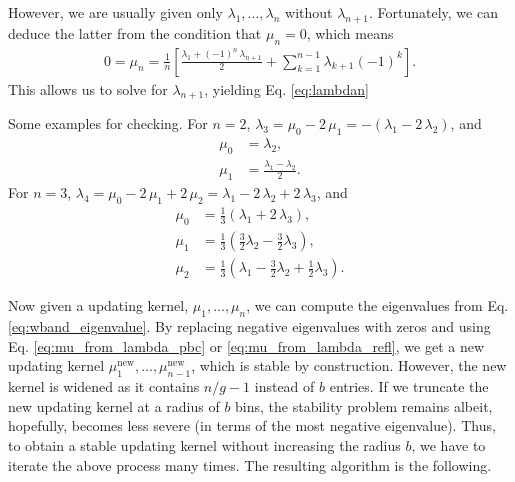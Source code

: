 \documentclass[reprint, floatfix]{revtex4-1}
\begin{document}
{  However, we are usually given only $\lambda_1, \dots, \lambda_n$
  without $\lambda_{n + 1}$.
  Fortunately, we can deduce the latter from
  the condition that $\mu_n = 0$, which means
  $$
  \begin{aligned}
    0 = \mu_n
    =
    \frac{1}{n}
    \left[
      \frac{ \lambda_1 + (-1)^n \, \lambda_{n+1} }
           {               2                     }
      +
      \sum_{ k = 1 }^{ n - 1 }
      \lambda_{k+1} (-1)^k
    \right].
  \end{aligned}
  $$
  This allows us to solve for $\lambda_{ n + 1 }$,
  yielding Eq. \eqref{eq:lambdan}


  Some examples for checking.
  For $n = 2$,
  $\lambda_3
  = \mu_0 - 2 \, \mu_1
  = -(\lambda_1 - 2 \, \lambda_2)$,
  and
  $$
  \begin{aligned}
  \mu_0
  &=
  \lambda_2,
  \\
  \mu_1
  &=
  \frac{ \lambda_1 - \lambda_2 }
       {           2           }
  .
  \end{aligned}
  $$
  For $n = 3$,
  $\lambda_4
  = \mu_0 - 2 \, \mu_1 + 2 \, \mu_2
  = \lambda_1 - 2 \, \lambda_2 + 2 \, \lambda_3$,
  and
  $$
  \begin{aligned}
  \mu_0
  &=
  \frac{ 1 } { 3 }
  \left(
    \lambda_1 + 2 \, \lambda_3
  \right)
  ,
  \\
  \mu_1
  &=
  \frac{ 1 } { 3 }
  \left(
    \frac 3 2 \lambda_2
    -
    \frac 3 2 \lambda_3
  \right)
  ,
  \\
  \mu_2
  &=
  \frac{ 1 } { 3 }
  \left(
    \lambda_1
    -
    \frac 3 2 \lambda_2
    +
    \frac 1 2 \lambda_3
  \right)
  .
  \end{aligned}
  $$
}

Now given a updating kernel, $\mu_1, \dots, \mu_n$,
we can compute the eigenvalues from
Eq. \eqref{eq:wband_eigenvalue}.
%
By replacing negative eigenvalues with zeros and
using Eq. \eqref{eq:mu_from_lambda_pbc}
or \eqref{eq:mu_from_lambda_refl},
we get a new updating kernel
$\mu^\mathrm{new}_1, \dots, \mu^\mathrm{new}_{n - 1}$,
which is stable by construction.
%
However, the new kernel
is widened
as it contains $n/g - 1$ instead of $b$ entries.
If we truncate the new updating kernel
at a radius of $b$ bins,
the stability problem remains
albeit, hopefully, becomes less severe
(in terms of the most negative eigenvalue).
%
Thus, to obtain a stable updating kernel
without increasing the radius $b$,
we have to iterate the above process many times.
The resulting algorithm is the following.
\end{document}
